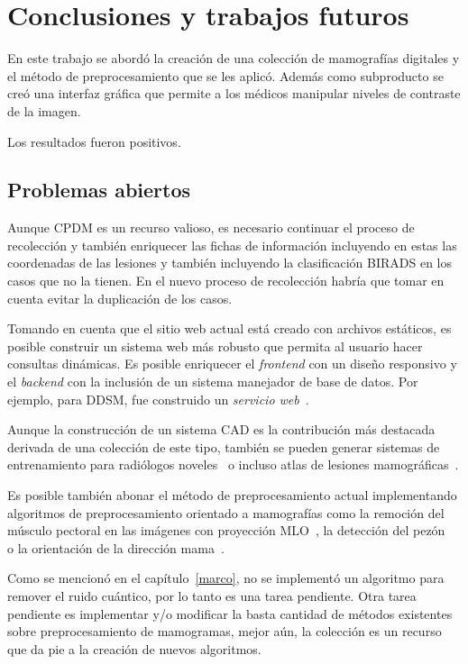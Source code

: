 \chapter{Conclusiones y trabajos futuros}
\label{conclusiones}

En este trabajo se abordó la creación de una colección de mamografías digitales
y el método de preprocesamiento que se les aplicó. Además como subproducto se
creó una interfaz gráfica que permite a los médicos manipular niveles de
contraste de la imagen. 

Los resultados fueron positivos. %

\section{Problemas abiertos}

Aunque CPDM es un recurso valioso, es necesario continuar el proceso de
recolección y también enriquecer las fichas de información incluyendo en estas
las coordenadas de las lesiones y también incluyendo la clasificación BIRADS en
los casos que no la tienen. En el nuevo proceso de recolección habría que tomar
en cuenta evitar la duplicación de los casos.

Tomando en cuenta que el sitio web actual está creado con archivos estáticos,
es posible construir un sistema web más robusto que permita al usuario hacer
consultas dinámicas. Es posible enriquecer el \textit{frontend} con un diseño
responsivo y el \textit{backend} con la inclusión de un sistema manejador de
base de datos. Por ejemplo, para DDSM, fue construido un \textit{servicio
web}~\cite{rose2006web}. 

Aunque la construcción de un sistema CAD es la contribución más destacada
derivada de una colección de este tipo, también se pueden generar sistemas de
entrenamiento para radiólogos noveles~\cite{suri2006recent} o incluso atlas de
lesiones mamográficas~\cite{antoniou2009web}.

Es posible también abonar el método de preprocesamiento actual implementando
algoritmos de preprocesamiento orientado a mamografías como la remoción del
músculo pectoral en las imágenes con proyección MLO~\cite{raba2005breast}, la
detección del pezón~\cite{mendez1996automatic} o la orientación de la dirección
mama~\cite{masek2003automatic}.

Como se mencionó en el capítulo~\ref{marco}, no se implementó un algoritmo para
remover el ruido cuántico, por lo tanto es una tarea pendiente. Otra tarea
pendiente es implementar y/o modificar la basta cantidad de métodos existentes
sobre preprocesamiento de mamogramas, mejor aún, la colección es un recurso que
da pie a la creación de nuevos algoritmos.


